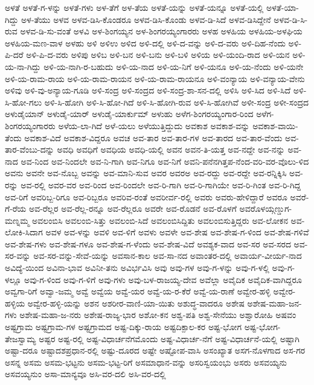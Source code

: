 ಅಳತೆ
ಅಳತೆ-ಗ-ಳನ್ನು
ಅಳತೆ-ಗಳು
ಅಳ-ತೆಗೆ
ಅಳ-ತೆಯ
ಅಳತೆ-ಯನ್ನು
ಅಳತೆ-ಯನ್ನೂ
ಅಳತೆ-ಯಲ್ಲಿ
ಅಳತೆ-ಯಾ-ಗಿದ್ದು
ಅಳ-ತೆಯು
ಅಳವ
ಅಳವ-ಡಿಸಿ-ಕೊಂಡರೂ
ಅಳವ-ಡಿಸಿ-ಕೊಂಡು
ಅಳವ-ಡಿ-ಸಿದೆ
ಅಳವ-ಡಿಸಿದ್ದೇನೆ
ಅಳವ-ಡಿ-ಸಿ-ರುವ
ಅಳವ-ಡಿ-ಸು-ವಂತೆ
ಅಳವಿ
ಅಳ-ಶಿಂಗಯ್ಯನ
ಅಳ-ಶಿಂಗರಯ್ಯಂಗಾರರು
ಅಳಹ
ಅಳಹಿಯ
ಅಳಹಿಯ-ಅಳಘಿಯ
ಅಳಹಿಯ-ಮಣ-ವಾಳ
ಅಳಹು
ಅಳಿ
ಅಳಿಉ
ಅಳಿದ
ಅಳಿ-ದಲ್ಲಿ
ಅಳಿ-ದ-ವನ್ನು
ಅಳಿ-ದ-ವರು
ಅಳಿ-ದಿಹ-ನೆಂದು
ಅಳಿ-ಪಿ-ದರೆ
ಅಳಿ-ಪಿ-ದ-ವರು
ಅಳಿಪು
ಅಳಿಬ
ಅಳಿ-ಬನ
ಅಳಿ-ಬನು
ಅಳಿ-ಬಳಿ
ಅಳಿಯ
ಅಳಿ-ಯಂದಿ-ರಾದ
ಅಳಿ-ಯನ
ಅಳಿ-ಯ-ನಾ-ಗಿದ್ದು
ಅಳಿ-ಯ-ನಾಗಿ-ರ-ಬಹುದು
ಅಳಿ-ಯ-ನಾದ
ಅಳಿ-ಯ-ನಿಗೆ
ಅಳಿ-ಯನೂ
ಅಳಿ-ಯ-ನೆಂದು
ಅಳಿ-ಯನೇ
ಅಳಿ-ಯ-ರಾಮ-ರಾಯ
ಅಳಿ-ಯ-ರಾಮ-ರಾಯನ
ಅಳಿ-ಯ-ರಾಮ-ರಾಯನೂ
ಅಳಿ-ವಂನ್ಯಾಯ
ಅಳಿ-ವನ್ಯಾಯ-ವೇನು
ಅಳಿವು
ಅಳಿ-ವು-ಅನ್ಯಾಯ-ಗೂಡಿ
ಅಳಿ-ಸಂದ್ರ
ಅಳಿ-ಸಂದ್ರದ
ಅಳಿ-ಸಂದ್ರ-ಶಾ-ಸನ-ದಲ್ಲಿ
ಅಳಿಸಿ
ಅಳಿ-ಸಿದ
ಅಳಿ-ಸಿದೆ
ಅಳಿ-ಸಿ-ಹೋ-ಗಲು
ಅಳಿ-ಸಿ-ಹೋಗಿ
ಅಳಿ-ಸಿ-ಹೋ-ಗಿದೆ
ಅಳಿ-ಸಿ-ಹೋಗಿ-ರುವ
ಅಳಿ-ಸಿ-ಹೋಗಿವೆ
ಅಳೀ-ಸಂದ್ರ
ಅಳೀ-ಸಂದ್ರದ
ಅಳುಡೈಯಾನ್
ಅಳುಡೈ-ಯಾರ್
ಅಳುಡೈ-ಯಾರ್ಕುಮ್
ಅಳುಹು
ಅಳೆಗ-ಶಿಂಗರಯ್ಯಂಗಾರ-ರಿಂದ
ಅಳೆಗ-ಶಿಂಗರಯ್ಯಂಗಾರರು
ಅಳೆಯ-ಲಾ-ಗಿದೆ
ಅಳೆ-ಯಲು
ಅಳೆಯುತ್ತಿದ್ದುದು
ಅವಕಾಶ
ಅವಕಾಶ-ವನ್ನು
ಅವಕಾಶ-ವಾಯಿ-ತೆಂದು
ಅವಕಾಶ-ವಿದೆ
ಅವಕಾಶ-ವಿದ್ದರೂ
ಅವಚ
ಅವ-ತಾರ
ಅವ-ತಾರ-ಗಳ
ಅವ-ತಾರದ
ಅವ-ತಾರ-ವೆಂದು
ಅವ-ತಾರ-ವೆಂಬು-ದನ್ನು
ಅವಧಿ
ಅವಧಿಗೆ
ಅವಧಿಯ
ಅವಧಿ-ಯಲ್ಲಿ
ಅವನ
ಅವನ-ತಿ-ಯತ್ತ
ಅವ-ನದ್ದೇ
ಅವ-ನನ್ನು
ಅವ-ನಾದ
ಅವ-ನಿಂದ
ಅವ-ನಿಂದಲೇ
ಅವ-ನಿ-ಗಾಗಿ
ಅವ-ನಿಗೂ
ಅವ-ನಿಗೆ
ಅವನಿ-ಪನೆನಗಿತ್ತಪ-ನೆಂದ-ವರಿ-ವರ-ವೊಲು-ಳಿದ
ಅವನು
ಅವನೇ
ಅವ-ನೊಬ್ಬ
ಅವನ್ನು
ಅವ-ಮಾನಿ-ಸುವ
ಅವರ
ಅವರಅ
ಅವ-ರದ್ದು
ಅವ-ರದ್ದೇ
ಅವ-ರನ್ನಿಕ್ಕಿಸಿ
ಅವ-ರನ್ನು
ಅವ-ರಲ್ಲಿ
ಅವರ-ವರ
ಅವ-ರಿಂದ
ಅವ-ರಿಂದಲೇ
ಅವ-ರಿ-ಗಾಗಿ
ಅವ-ರಿ-ಗಾಗಿಯೇ
ಅವ-ರಿ-ಗಿಂತ
ಅವ-ರಿ-ಗಿದ್ದ
ಅವ-ರಿಗೆ
ಅವರಿಬ್ಬ-ರಿಗೂ
ಅವ-ರಿಬ್ಬರೂ
ಅವರಿವ-ರಂತೆ
ಅವರೀರ್ವ-ರಲ್ಲಿ
ಅವರು
ಅವರು-ಹೇಳಿದ್ದಾರೆ
ಅವರೂ
ಅವರೆ-ಗೆ-ರೆಯ
ಅವ-ರೆಲ್ಲರ
ಅವ-ರೆಲ್ಲ-ರನ್ನೂ
ಅವ-ರೆಲ್ಲರೂ
ಅವರೇ
ಅವ-ರೊಡನೆ
ಅವ-ರೊಳಗೆ
ಅವರೊಳಯ್ಗಣ್ಡುಗ-ಮಣ್ನಮ್ಮ
ಅವಲಂಬಿಸಿ
ಅವಲಂಬಿ-ಸಿತ್ತು
ಅವಲಂಬಿ-ಸಿದೆ
ಅವಲಂಬಿಸಿದ್ದಿತು
ಅವಲಂಬಿಸುತ್ತಿದ್ದರು
ಅವ-ಲೋಕನ
ಅವ-ಲೋಕಿ-ಸಿದಾಗ
ಅವಳ
ಅವ-ಳನ್ನು
ಅವಳಿ
ಅವ-ಳಿಗೆ
ಅವಳು
ಅವಳೇ
ಅವ-ಶೇಷ
ಅವ-ಶೇಷ-ಗ-ಳಿಂದ
ಅವ-ಶೇಷ-ಗಳಿವೆ
ಅವ-ಶೇಷ-ಗಳು
ಅವ-ಶೇಷ-ಗಳೂ
ಅವ-ಶೇಷ-ಗ-ಳೆಂದು
ಅವ-ಶೇಷ-ವಿದೆ
ಅವಶ್ಯಕ-ವಾದ
ಅವ-ಸರ
ಅವ-ಸರದ
ಅವ-ಸರ-ವನ್ನು
ಅವ-ಸರ-ವನ್ನು-ಸೇವೆ-ಯನ್ನು
ಅವಸಾನ-ಕಾಲ
ಅವ-ಸಾ-ನದ
ಅವಾಂತರ-ದಲ್ಲಿ
ಅವಾರ್ಯ-ವೀರ್ಯ-ನಾದ
ಅವಿದ್ಯೆ-ಯಿಂದ
ಅವಿನಾ-ಭಾವ
ಅವಿನೀ-ತನು
ಅವಿರ್ಭವಿಸಿ
ಅವು
ಅವು-ಗಳ
ಅವು-ಗ-ಳನ್ನು
ಅವು-ಗ-ಳಲ್ಲಿ
ಅವು-ಗ-ಳಲ್ಲೂ
ಅವು-ಗ-ಳಿಂದ
ಅವು-ಗ-ಳಿಗೆ
ಅವು-ಗಳು
ಅವು-ಬಳ-ರಾಜಯ್ಯ-ದೇವ
ಅವೆಲ್ಲಾ
ಅವೈದಿಕ
ಅವೈದಿಕ-ವಾಗಿದ್ದರೂ
ಅವ್ವಗಾ-ರಿಗೆ
ಅವ್ವಾ-ಜಮ್ಮ
ಅವ್ವೆ
ಅವ್ವೆಯ
ಅವ್ವೆ-ಯರ
ಅವ್ವೆ-ಯ-ರ-ಕೆರೆ
ಅವ್ವೆ-ಯ-ರಾಣೆ
ಅವ್ವೇರ-ಹಳ್ಳಿ
ಅವ್ವೇರ-ಹಳ್ಳಿಯ
ಅವ್ವೇರ-ಹಳ್ಳಿ-ಯನ್ನು
ಅಶನ
ಅಶರೀರ-ವಾಣಿ-ಯಾ-ಯಿತು
ಅಶುದ್ಧ-ವಾದರೂ
ಅಶೇಷ
ಅಶೇಷ-ಮಹಾ-ಜನ-ಗಳು
ಅಶೇಷ-ಮಹಾ-ಜ-ನರು
ಅಶೇಷ-ರಾಜ್ಯ-ಭಾರ
ಅಶೋ-ಕನ
ಅಶ್ವ-ಪತಿ
ಅಶ್ವ-ಸೇನೆಯು
ಅಶ್ವಾರೋಹಿ
ಅಷವಂ
ಅಷ್ಟಗ್ರಾಮ
ಅಷ್ಟಗ್ರಾಮ-ಗಳ
ಅಷ್ಟಗ್ರಾಮದ
ಅಷ್ಟ-ದಿಕ್ಕು-ರಾಯ
ಅಷ್ಟದಿಕ್ಪಾಲ-ಕರ
ಅಷ್ಟ-ಭೋಗ
ಅಷ್ಟ-ಭೋಗ-ತೇಜಸ್ವಾಮ್ಯ
ಅಷ್ಟರ
ಅಷ್ಟ-ರಲ್ಲಿ
ಅಷ್ಟ-ವಿಧಾರ್ಚನೆಗಮೊಂದು
ಅಷ್ಟ-ವಿಧಾರ್ಚ-ನೆಗೆ
ಅಷ್ಟ-ವಿಧಾರ್ಚನೆ-ಯಲ್ಲಿ
ಅಷ್ಟಾಗಿ
ಅಷ್ಟಾ-ದರೂ
ಅಷ್ಟಾದಶಪ್ರಧಾನ-ರಲ್ಲಿ
ಅಷ್ಟು-ದೂರದ
ಅಷ್ಟೇ
ಅಷ್ಟೋಪ-ವಾಸಿ
ಅಸಂಖ್ಯಾತ
ಅಸಗ-ನೊಳಗಾದ
ಅಸ-ಗರ
ಅಸನ್ನ
ಅಸಮ
ಅಸಮ-ಭಟ್ಟನು
ಅಸಮ-ಭಟ್ಟ-ರಿಗೆ
ಅಸಮಾಧಾನ-ವನ್ನು
ಅಸರಿಸ್ವಯಂಭು
ಅಸರು
ಅಸವಯ್ಯನು
ಅಸವಯ್ಯನುಂ
ಅಸಾ-ಮಾನ್ಯವೂ
ಅಸಿ-ವರ-ದಲಿ
ಅಸಿ-ವರ-ದಲ್ಲಿ
